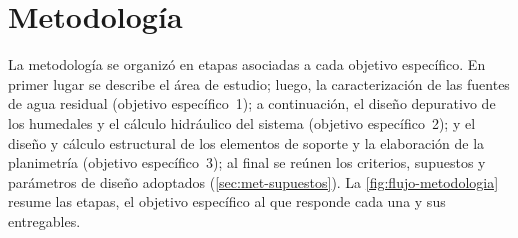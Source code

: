 \chapter{Metodología}
\label{cap:metodologia}


La metodología se organizó en etapas asociadas a cada objetivo específico.
En primer lugar se describe el área de estudio; luego, la caracterización de las fuentes de agua residual (objetivo específico~1); a continuación, el diseño depurativo de los humedales y el cálculo hidráulico del sistema (objetivo específico~2); y el diseño y cálculo estructural de los elementos de soporte y la elaboración de la planimetría (objetivo específico~3); al final se reúnen los criterios, supuestos y parámetros de diseño adoptados (\cref{sec:met-supuestos}).
La \cref{fig:flujo-metodologia} resume las etapas, el objetivo específico al que responde cada una y sus entregables.

